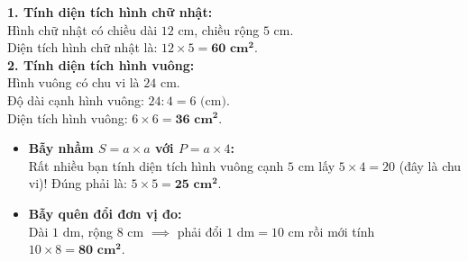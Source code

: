 \documentclass[11pt,a4paper]{article}
\begin{document}
\vspace{-2.5mm}
\noindent
\begin{minipage}[t]{0.49\textwidth}\vspace{0pt}
\begin{tcolorbox}[
  enhanced,
  colback=green!4!white,
  colframe=green!60!black,
  arc=2mm, boxrule=0.8pt,
  left=2mm, right=2mm, top=1.8mm, bottom=1.8mm,
  title={\footnotesize\bfseries\color{white}\faCheckCircle\ Ví dụ thực hành chuẩn mực}
]
{\footnotesize
\textbf{1. Tính diện tích hình chữ nhật:}\\
Hình chữ nhật có chiều dài $12\text{ cm}$, chiều rộng $5\text{ cm}$.\\
Diện tích hình chữ nhật là: $12 \times 5 = \mathbf{60\text{ cm}^2}$.\\
\textbf{2. Tính diện tích hình vuông:}\\
Hình vuông có chu vi là $24\text{ cm}$.\\
Độ dài cạnh hình vuông: $24 : 4 = 6\text{ (cm)}$.\\
Diện tích hình vuông: $6 \times 6 = \mathbf{36\text{ cm}^2}$.
}
\end{tcolorbox}
\end{minipage}
\hfill
\begin{minipage}[t]{0.49\textwidth}\vspace{0pt}
\begin{tcolorbox}[
  enhanced,
  colback=red!4!white,
  colframe=red!70!black,
  arc=2mm, boxrule=0.8pt,
  left=2mm, right=2mm, top=1.8mm, bottom=1.8mm,
  title={\footnotesize\bfseries\color{white}\faExclamationTriangle\ Mẹo tránh bẫy trắc nghiệm}
]
{\footnotesize
\begin{itemize}\setlength{\itemsep}{1.5pt}\setlength{\leftskip}{-2.5mm}
  \item \textbf{Bẫy nhầm $S = a \times a$ với $P = a \times 4$:}\\
  Rất nhiều bạn tính diện tích hình vuông cạnh $5\text{ cm}$ lấy $5 \times 4 = 20$ (đây là chu vi)! Đúng phải là: $5 \times 5 = \mathbf{25\text{ cm}^2}$.
  \item \textbf{Bẫy quên đổi đơn vị đo:}\\
  Dài $1\text{ dm}$, rộng $8\text{ cm}$ $\implies$ phải đổi $1\text{ dm} = 10\text{ cm}$ rồi mới tính $10 \times 8 = \mathbf{80\text{ cm}^2}$.
\end{itemize}
}
\end{tcolorbox}
\end{minipage}
\end{document}
